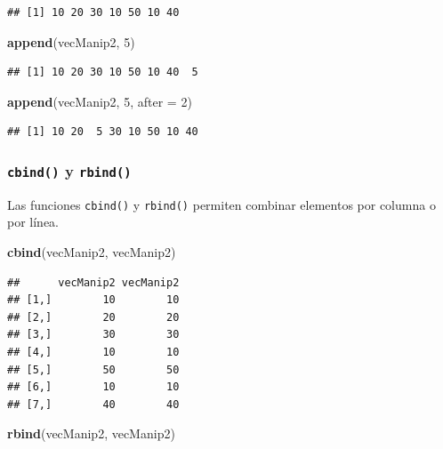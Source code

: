 \documentclass[
]{book}
\newenvironment{Shaded}{\begin{snugshade}}{\end{snugshade}}
\newcommand{\DataTypeTok}[1]{\textcolor[rgb]{0.13,0.29,0.53}{#1}}
\newcommand{\DecValTok}[1]{\textcolor[rgb]{0.00,0.00,0.81}{#1}}
\newcommand{\KeywordTok}[1]{\textcolor[rgb]{0.13,0.29,0.53}{\textbf{#1}}}
\newcommand{\NormalTok}[1]{#1}
\begin{document}
\begin{verbatim}
## [1] 10 20 30 10 50 10 40
\end{verbatim}

\begin{Shaded}
\begin{Highlighting}[]
\KeywordTok{append}\NormalTok{(vecManip2, }\DecValTok{5}\NormalTok{)}
\end{Highlighting}
\end{Shaded}

\begin{verbatim}
## [1] 10 20 30 10 50 10 40  5
\end{verbatim}

\begin{Shaded}
\begin{Highlighting}[]
\KeywordTok{append}\NormalTok{(vecManip2, }\DecValTok{5}\NormalTok{, }\DataTypeTok{after =} \DecValTok{2}\NormalTok{)}
\end{Highlighting}
\end{Shaded}

\begin{verbatim}
## [1] 10 20  5 30 10 50 10 40
\end{verbatim}

\hypertarget{l015cbind}{%
\subsubsection{\texorpdfstring{\texttt{cbind()} y \texttt{rbind()}}{cbind() y rbind()}}\label{l015cbind}}

Las funciones \texttt{cbind()} y \texttt{rbind()} permiten combinar elementos por columna o por línea.

\begin{Shaded}
\begin{Highlighting}[]
\KeywordTok{cbind}\NormalTok{(vecManip2, vecManip2)}
\end{Highlighting}
\end{Shaded}

\begin{verbatim}
##      vecManip2 vecManip2
## [1,]        10        10
## [2,]        20        20
## [3,]        30        30
## [4,]        10        10
## [5,]        50        50
## [6,]        10        10
## [7,]        40        40
\end{verbatim}

\begin{Shaded}
\begin{Highlighting}[]
\KeywordTok{rbind}\NormalTok{(vecManip2, vecManip2)}
\end{Highlighting}
\end{Shaded}
\end{document}
